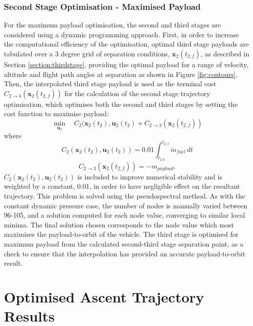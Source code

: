 \subsubsection{Second Stage Optimisation - Maximised Payload}
For the maximum payload optimisation, the second and third stages are considered using a dynamic programming approach. First, in order to increase the computational efficiency of the optimisation, optimal third stage payloads are tabulated  over a 3 degree grid of separation conditions, $\textbf{x}_2(t_{2,f})$, as described in Section \ref{section:thirdstage}, providing the optimal payload for a range of velocity, altitude and flight path angles at separation as shown in Figure \ref{fig:contours}. Then, the interpolated third stage payload is used as the terminal cost $C_{2 \rightarrow 3}(\textbf{x}_2(t_{2,f}))$ for the calculation of the second stage trajectory optimisation, which optimises both the second and third stages by setting the cost function to maximise payload:
\begin{equation}
\min\limits_{\textbf{u}_2} \quad C_2(\textbf{x}_{2}(t_2),\textbf{u}_{2}(t_2) + C_{2 \rightarrow 3}(\textbf{x}_2 (t_{2,f}))
\end{equation}
where
\begin{equation}
C_2(\textbf{x}_{2}(t_2),\textbf{u}_{2}(t_2)) = 0.01\int_{t_{2,0}}^{t_{2,f}}\dot{m}_{fuel} \, dt
\end{equation}
\begin{equation}
C_{2 \rightarrow 3}(\textbf{x}_2(t_{2,f})) = -m_{payload}.
\end{equation}
$C_{2}(\textbf{x}_{2}(t_2),\textbf{u}_{2}(t_2))$ is included to improve numerical stability and is weighted by a constant, 0.01, in order to have negligible effect on the resultant trajectory.
This problem is solved using the pseudospectral method\cite{Ross2004}.  As with the constant dynamic pressure case, the number of nodes is manually varied between 96-105, and a solution computed for each node value, converging to similar local minima. The final solution chosen corresponds to the node value which most maximises the payload-to-orbit of the vehicle.
The third stage is optimised for maximum payload from the calculated second-third stage separation point, as a check to ensure that the interpolation has provided an accurate payload-to-orbit result. 


\section{Optimised Ascent Trajectory Results}


